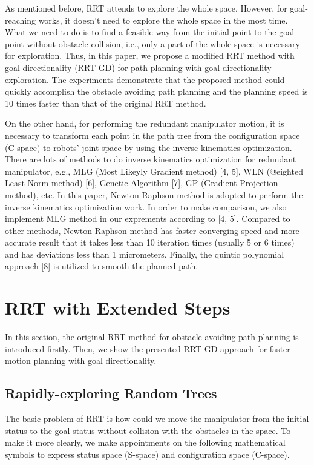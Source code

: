 \documentclass[letterpaper, 10 pt, conference]{ieeeconf}  %
\begin{document}
As mentioned before, RRT attends to explore the whole space. However, for goal-reaching works, it doesn't need to explore the whole space in the most time. What we need to do is to find a feasible way from the initial point to the goal point without obstacle collision, i.e., only a part of the whole space is necessary for exploration. Thus, in this paper, we propose a modified RRT method with goal directionality (RRT-GD) for path planning with goal-directionality exploration. The experiments demonstrate that the proposed method could quickly accomplish the obstacle avoiding path planning and the planning speed is 10 times faster than that of the original RRT method.

On the other hand, for performing the redundant manipulator motion, it is necessary to transform each point in the path tree from the configuration space (C-space) to robots' joint space by using the inverse kinematics optimization. There are lots of methods to do inverse kinematics optimization for redundant manipulator, e.g., MLG (Most Likeyly Gradient method) [4, 5], WLN (@eighted Least Norm method) [6], Genetic Algorithm [7], GP (Gradient Projection method), etc. In this paper, Newton-Raphson method is adopted to perform the inverse kinematics optimization work. In order to make comparison, we also implement MLG method in our exprements according to [4, 5]. Compared to other methods, Newton-Raphson method has faster converging speed and more accurate result that it takes less than 10 iteration times (usually 5 or 6 times) and has deviations less than 1 micrometers. Finally, the quintic polynomial approach [8] is utilized to smooth the planned path.

\section{RRT with Extended Steps}

In this section, the original RRT method for obstacle-avoiding path planning is introduced firstly. Then, we show the presented RRT-GD approach for faster motion planning with goal directionality.

\subsection{Rapidly-exploring Random Trees}

The basic problem of RRT is how could we move the manipulator from the initial status to the goal status without collision with the obstacles in the space. To make it more clearly, we make appointments on the following mathematical symbols to express status space (S-space) and configuration space (C-space).
\end{document}
